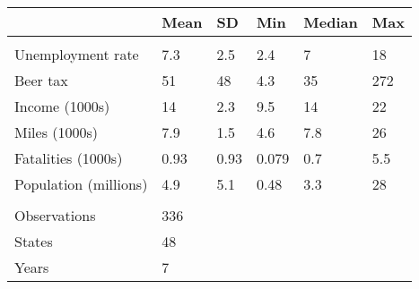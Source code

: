 
\begin{tabular}[t]{llllll}
\toprule
  & Mean & SD & Min & Median & Max\\
\midrule
\addlinespace[0.3em]
\multicolumn{6}{l}{\textit{Variables}}\\
\hspace{1em}Unemployment rate & 7.3 & 2.5 & 2.4 & 7 & 18\\
\hspace{1em}Beer tax & 51 & 48 & 4.3 & 35 & 272\\
\hspace{1em}Income (1000s) & 14 & 2.3 & 9.5 & 14 & 22\\
\hspace{1em}Miles (1000s) & 7.9 & 1.5 & 4.6 & 7.8 & 26\\
\hspace{1em}Fatalities (1000s) & 0.93 & 0.93 & 0.079 & 0.7 & 5.5\\
\hspace{1em}Population (millions) & 4.9 & 5.1 & 0.48 & 3.3 & 28\\
\addlinespace[0.3em]
\multicolumn{6}{l}{\textit{Counts}}\\
\hspace{1em}Observations & 336 &  &  &  & \\
\hspace{1em}States & 48 &  &  &  & \\
\hspace{1em}Years & 7 &  &  &  & \\
\bottomrule
\end{tabular}
